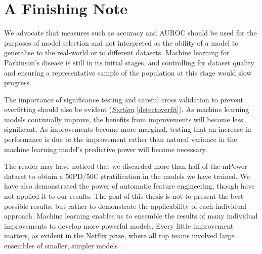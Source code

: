 \documentclass[12pt, twoside]{book}
\begin{document}
\section{A Finishing Note}
We advocate that measures such as accuracy and AUROC should be used for the purposes of model selection and not interpreted as the ability of a model to generalise to the real-world or to different datasets. Machine learning for Parkinson's disease is still in its initial stages, and controlling for dataset quality and ensuring a representative sample of the population at this stage would slow progress.

The importance of significance testing and careful cross validation to prevent overfitting should also be evident (\textit{\hyperref[detectoverfit]{Section}} \ref{detectoverfit}). As machine learning models continually improve, the benefits from improvements will become less significant. As improvements become more marginal, testing that an increase in performance is due to the improvement rather than natural variance in the machine learning model's predictive power will become necessary. 

The reader may have noticed that we discarded more than half of the mPower dataset to obtain a 50PD/50C stratification in the models we have trained. We have also demonstrated the power of automatic feature engineering, though have not applied it to our results. The goal of this thesis is not to present the best possible results, but rather to demonstrate the applicability of each individual approach. Machine learning enables us to ensemble the results of many individual improvements to develop more powerful models. Every little improvement matters, as evident in the Netflix prize, where all top teams involved large ensembles of smaller, simpler models~\cite{netflixprizebellkor}.



\backmatter


\end{document}
